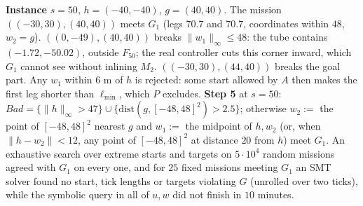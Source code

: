 \documentclass[10pt]{article}
\begin{document}
\textbf{Instance} $s=50$, $h=(-40,-40)$, $g=(40,40)$. The mission $((-30,30),(40,40))$ meets $G_1$ (legs $70.7$ and $70.7$, coordinates within $48$, $w_2=g$). $((0,-49),(40,40))$ breaks $\lVert w_1\rVert_\infty\le48$: the tube contains $(-1.72,-50.02)$, outside $F_{50}$; the real controller cuts this corner inward, which $G_1$ cannot see without inlining $M_2$. $((-30,30),(44,40))$ breaks the goal part. Any $w_1$ within $6$ m of $h$ is rejected: some start allowed by $A$ then makes the first leg shorter than $\ell_{\min}$, which $P$ excludes. \textbf{Step 5} at $s=50$: $\mathit{Bad}=\{\lVert h\rVert_\infty>47\}\cup\{\mathrm{dist}(g,[-48,48]^2)>2.5\}$; otherwise $w_2:=$ the point of $[-48,48]^2$ nearest $g$ and $w_1:=$ the midpoint of $h,w_2$ (or, when $\lVert h-w_2\rVert<12$, any point of $[-48,48]^2$ at distance $20$ from $h$) meet $G_1$. An exhaustive search over extreme starts and targets on $5\cdot10^4$ random missions agreed with $G_1$ on every one, and for $25$ fixed missions meeting $G_1$ an SMT solver found no start, tick lengths or targets violating $G$ (unrolled over two ticks), while the symbolic query in all of $u,w$ did not finish in $10$ minutes.
\end{document}
